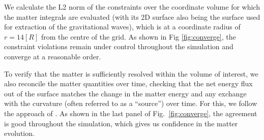 \documentclass[twocolumn, numberedappendix, twocolappendix,apj, iop, a4paper]{openjournal}
\begin{document}
We calculate the L2 norm of the constraints over the coordinate volume for which the matter integrals are evaluated (with its 2D surface also being the surface used for extraction of the gravitational waves), which is at a coordinate radius of $r=14[R]$ from the centre of the grid.
As shown in Fig \ref{fig:converge}, the constraint violations remain under control throughout the simulation and converge at a reasonable order.

To verify that the matter is sufficiently resolved within the volume of interest, we also reconcile the matter quantities over time, checking that the net energy flux out of the surface matches the change in the matter energy and any exchange with the curvature (often referred to as a ``source'') over time. For this, we follow the approach of \cite{Clough:2021qlv}. As shown in the last panel of Fig.~\ref{fig:converge}, the agreement is good throughout the simulation, which gives us confidence in the matter evolution.

 

%
%  

\end{document}
